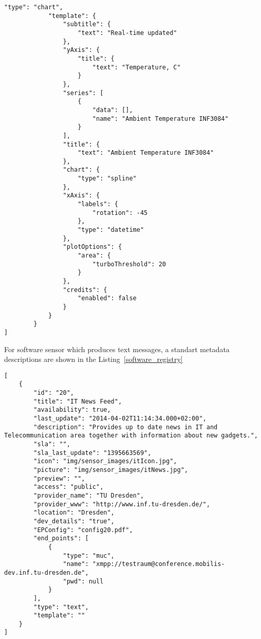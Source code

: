 \begin{lstlisting}[label=hardware_registry,caption=JSON Description Format]
            "type": "chart",
            "template": {
                "subtitle": {
                    "text": "Real-time updated"
                },
                "yAxis": {
                    "title": {
                        "text": "Temperature, C"
                    }
                },
                "series": [
                    {
                        "data": [],
                        "name": "Ambient Temperature INF3084"
                    }
                ],
                "title": {
                    "text": "Ambient Temperature INF3084"
                },
                "chart": {
                    "type": "spline"
                },
                "xAxis": {
                    "labels": {
                        "rotation": -45
                    },
                    "type": "datetime"
                },
                "plotOptions": {
                    "area": {
                        "turboThreshold": 20
                    }
                },
                "credits": {
                    "enabled": false
                }
            }
        }
]
\end{lstlisting}
For software sensor which produces text messages, a standart metadata descriptions are shown in the Listing~\ref{software_registry}
\begin{lstlisting}[label=software_registry,caption=JSON Description Format for Software Sensor]
[
    {
        "id": "20",
        "title": "IT News Feed",
        "availability": true,
        "last_update": "2014-04-02T11:14:34.000+02:00",
        "description": "Provides up to date news in IT and Telecommunication area together with information about new gadgets.",
        "sla": "",
        "sla_last_update": "1395663569",
        "icon": "img/sensor_images/itIcon.jpg",
        "picture": "img/sensor_images/itNews.jpg",
        "preview": "",
        "access": "public",
        "provider_name": "TU Dresden",
        "provider_www": "http://www.inf.tu-dresden.de/",
        "location": "Dresden",
        "dev_details": "true",
        "EPConfig": "config20.pdf",
        "end_points": [
            {
                "type": "muc",
                "name": "xmpp://testraum@conference.mobilis-dev.inf.tu-dresden.de",
                "pwd": null
            }
        ],
        "type": "text",
        "template": ""
    }
]
\end{lstlisting}

